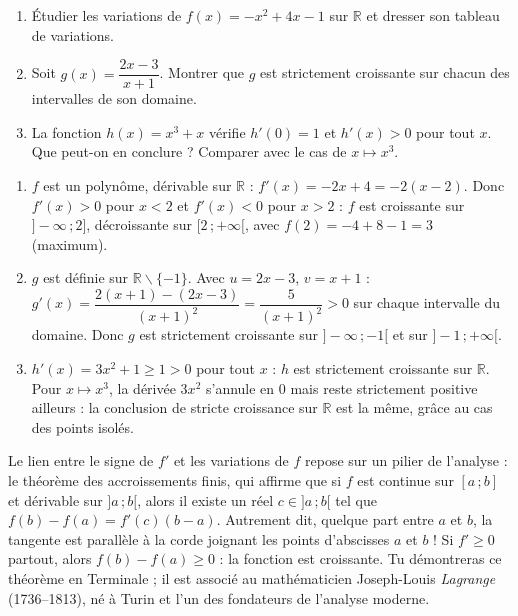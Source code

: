 \documentclass[11pt]{article}
\newcommand{\cle}[1]{{\popxbold\color{popdark}#1}}
\def\setminus{\mathbin{\backslash}}\let\smallsetminus\setminus
\begin{document}
\begin{exercice}
\begin{enumerate}
\item Étudier les variations de $f(x) = -x^2 + 4x - 1$ sur $\mathbb{R}$ et dresser son tableau de variations.
\item Soit $g(x) = \dfrac{2x-3}{x+1}$. Montrer que $g$ est strictement croissante sur chacun des intervalles de son domaine.
\item La fonction $h(x) = x^3 + x$ vérifie $h'(0) = 1$ et $h'(x) > 0$ pour tout $x$. Que peut-on en conclure ? Comparer avec le cas de $x \mapsto x^3$.
\end{enumerate}
\end{exercice}

\begin{corrige}[Exercice n°1]
\begin{enumerate}
\item $f$ est un polynôme, dérivable sur $\mathbb{R}$ : $f'(x) = -2x + 4 = -2(x-2)$. Donc $f'(x) > 0$ pour $x < 2$ et $f'(x) < 0$ pour $x > 2$ : $f$ est croissante sur $]-\infty\,;2]$, décroissante sur $[2\,;+\infty[$, avec $f(2) = -4+8-1 = 3$ (maximum).
\item $g$ est définie sur $\mathbb{R}\setminus\{-1\}$. Avec $u = 2x-3$, $v = x+1$ : $g'(x) = \dfrac{2(x+1)-(2x-3)}{(x+1)^2} = \dfrac{5}{(x+1)^2} > 0$ sur chaque intervalle du domaine. Donc $g$ est strictement croissante sur $]-\infty\,;-1[$ et sur $]-1\,;+\infty[$.
\item $h'(x) = 3x^2 + 1 \geq 1 > 0$ pour tout $x$ : $h$ est strictement croissante sur $\mathbb{R}$. Pour $x \mapsto x^3$, la dérivée $3x^2$ s'annule en $0$ mais reste strictement positive ailleurs : la conclusion de stricte croissance sur $\mathbb{R}$ est la même, grâce au cas des points isolés.
\end{enumerate}
\end{corrige}

\begin{savaistu}
Le lien entre le signe de $f'$ et les variations de $f$ repose sur un pilier de l'analyse : le \cle{théorème des accroissements finis}, qui affirme que si $f$ est continue sur $[a\,;b]$ et dérivable sur $]a\,;b[$, alors il existe un réel $c \in ]a\,;b[$ tel que $f(b) - f(a) = f'(c)(b-a)$. Autrement dit, quelque part entre $a$ et $b$, la tangente est parallèle à la corde joignant les points d'abscisses $a$ et $b$ ! Si $f' \geq 0$ partout, alors $f(b) - f(a) \geq 0$ : la fonction est croissante. Tu démontreras ce théorème en Terminale ; il est associé au mathématicien Joseph-Louis \emph{Lagrange} (1736--1813), né à Turin et l'un des fondateurs de l'analyse moderne.
\end{savaistu}
\end{document}
